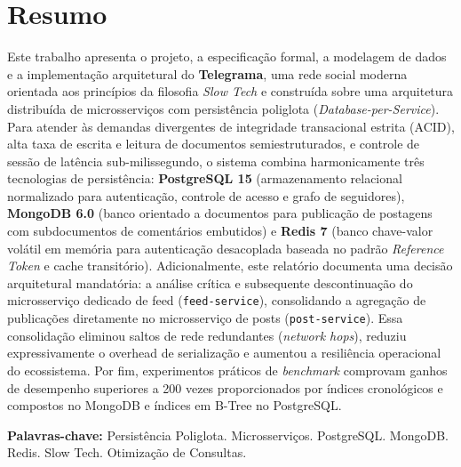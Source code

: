 \documentclass[12pt,a4paper]{report}
\begin{document}
\chapter*{Resumo}
Este trabalho apresenta o projeto, a especificação formal, a modelagem de dados e a implementação arquitetural do \textbf{Telegrama}, uma rede social moderna orientada aos princípios da filosofia \textit{Slow Tech} e construída sobre uma arquitetura distribuída de microsserviços com persistência poliglota (\textit{Database-per-Service}). Para atender às demandas divergentes de integridade transacional estrita (ACID), alta taxa de escrita e leitura de documentos semiestruturados, e controle de sessão de latência sub-milissegundo, o sistema combina harmonicamente três tecnologias de persistência: \textbf{PostgreSQL 15} (armazenamento relacional normalizado para autenticação, controle de acesso e grafo de seguidores), \textbf{MongoDB 6.0} (banco orientado a documentos para publicação de postagens com subdocumentos de comentários embutidos) e \textbf{Redis 7} (banco chave-valor volátil em memória para autenticação desacoplada baseada no padrão \textit{Reference Token} e cache transitório). Adicionalmente, este relatório documenta uma decisão arquitetural mandatória: a análise crítica e subsequente descontinuação do microsserviço dedicado de feed (\texttt{feed-service}), consolidando a agregação de publicações diretamente no microsserviço de posts (\texttt{post-service}). Essa consolidação eliminou saltos de rede redundantes (\textit{network hops}), reduziu expressivamente o overhead de serialização e aumentou a resiliência operacional do ecossistema. Por fim, experimentos práticos de \textit{benchmark} comprovam ganhos de desempenho superiores a 200 vezes proporcionados por índices cronológicos e compostos no MongoDB e índices em B-Tree no PostgreSQL.

\noindent\textbf{Palavras-chave:} Persistência Poliglota. Microsserviços. PostgreSQL. MongoDB. Redis. Slow Tech. Otimização de Consultas.

\newpage
\end{document}
